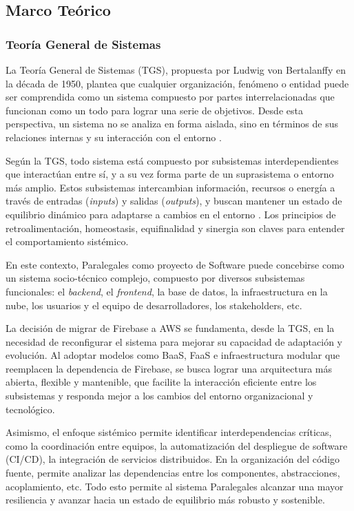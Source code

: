 \subsection{Marco Teórico}

\subsubsection{Teoría General de Sistemas}

La Teoría General de Sistemas (TGS), propuesta por Ludwig von Bertalanffy en la década de 1950, plantea que cualquier organización, fenómeno o entidad puede ser comprendida como un sistema compuesto por partes interrelacionadas que funcionan como un todo para lograr una serie de objetivos. Desde esta perspectiva, un sistema no se analiza en forma aislada, sino en términos de sus relaciones internas y su interacción con el entorno \cite{Bertalanffy1968}.

Según la TGS, todo sistema está compuesto por subsistemas interdependientes que interactúan entre sí, y a su vez forma parte de un suprasistema o entorno más amplio. Estos subsistemas intercambian información, recursos o energía a través de entradas (\textit{inputs}) y salidas (\textit{outputs}), y buscan mantener un estado de equilibrio dinámico para adaptarse a cambios en el entorno \cite{Bertalanffy1968}. Los principios de retroalimentación, homeostasis, equifinalidad y sinergia son claves para entender el comportamiento sistémico.

En este contexto, Paralegales como proyecto de Software puede concebirse como un sistema socio-técnico complejo, compuesto por diversos subsistemas funcionales: el \textit{backend}, el \textit{frontend}, la base de datos, la infraestructura en la nube, los usuarios y el equipo de desarrolladores, los stakeholders, etc.

La decisión de migrar de Firebase a AWS se fundamenta, desde la TGS, en la necesidad de reconfigurar el sistema para mejorar su capacidad de adaptación y evolución. Al adoptar modelos como BaaS, FaaS e infraestructura modular que reemplacen la dependencia de Firebase, se busca lograr una arquitectura más abierta, flexible y mantenible, que facilite la interacción eficiente entre los subsistemas y responda mejor a los cambios del entorno organizacional y tecnológico.

Asimismo, el enfoque sistémico permite identificar interdependencias críticas, como la coordinación entre equipos, la automatización del despliegue de software (CI/CD), la integración de servicios distribuidos. En la organización del código fuente, permite analizar las dependencias entre los componentes, abstracciones, acoplamiento, etc. Todo esto permite al sistema Paralegales alcanzar una mayor resiliencia y avanzar hacia un estado de equilibrio más robusto y sostenible.
